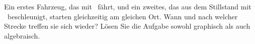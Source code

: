 Ein erstes Fahrzeug, das mit \vFO\ fährt, und ein zweites, das aus dem Stillstand mit \aFO\ beschleunigt, starten gleichzeitig am gleichen Ort. Wann und nach welcher Strecke treffen sie sich wieder? Lösen Sie die Aufgabe sowohl graphisch als auch algebraisch.
